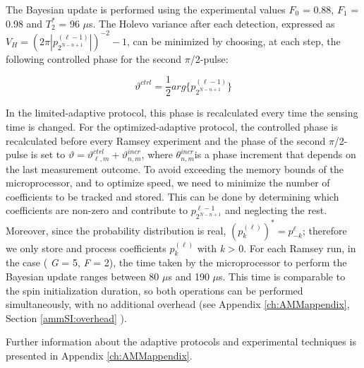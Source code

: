 The Bayesian update is performed using the experimental values $F_{0}$ = 0.88, $F_{1}$ = 0.98 and $T_2^*$ = 96 $\mu$s.
The Holevo variance after each detection, expressed as  $V_H = (2 \pi | p_{2^{N-n+1}}^{(\ell - 1)}|)^{-2}-1$, can be minimized by choosing, at each step, the following controlled phase for the second $\pi$/2-pulse\cite{Cappellaro_Phys.Rev.A_2012}:

\begin{equation}
\vartheta^{ctrl} = \frac{1}{2}  arg \{ p_{2^{N-n+1}} ^{(\ell - 1)} \}
\end{equation}

In the limited-adaptive protocol, this phase is recalculated every time the sensing time is changed. For the optimized-adaptive protocol, the controlled phase is recalculated before every Ramsey experiment and the phase of the second $\pi$/2-pulse is set to $\vartheta = \vartheta_{\ell,m}^{ctrl} + \vartheta_{n,m}^{incr}$, where $\theta_{n,m}^{incr}$is a phase increment that depends on the last measurement outcome\cite{Hayes_Phys.Rev.A_2014}.
To avoid exceeding the memory bounds of the microprocessor, and to optimize speed, we need to minimize the number of coefficients to be tracked and stored. This can be done by determining which coefficients are non-zero and contribute to $p_{2^{N-n+1}}^{\ell - 1}$ and neglecting the rest. Moreover, since the probability distribution is real, $(p_{k}^{(\ell)})^*=p_{-k}^{\ell}$; therefore we only store and process coefficients $p_{k}^{(\ell)}$ with \textit{k} > 0.
For each Ramsey run, in the case ( \textit{G} = 5, \textit{F} = 2), the time taken by the microprocessor to perform the Bayesian update ranges between 80 $\mu$s and 190 $\mu$s. This time is comparable to the spin initialization duration, so both operations can be performed simultaneously, with no additional overhead (see Appendix \ref{ch:AMMappendix}, Section \ref{ammSI:overhead} ).

Further information about the adaptive protocols and experimental techniques is presented in Appendix \ref{ch:AMMappendix}.

\clearpage



